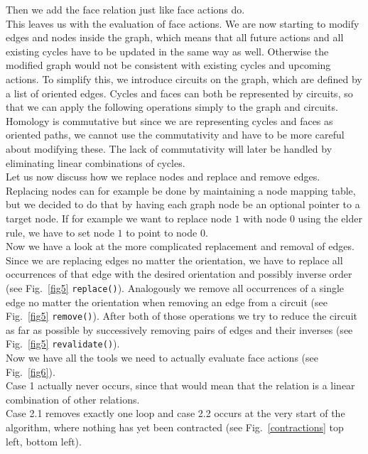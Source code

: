 \documentclass[11pt, a4paper, UKenglish]{article}
\begin{document}
    Then we add the face relation just like face actions do.\\
    This leaves us with the evaluation of face actions.
    We are now starting to modify edges and nodes inside the graph, which means that all future actions and all existing cycles have to be updated in the same way as well.
    Otherwise the modified graph would not be consistent with existing cycles and upcoming actions.
    To simplify this, we introduce circuits on the graph, which are defined by a list of oriented edges.
    Cycles and faces can both be represented by circuits, so that we can apply the following operations simply to the graph and circuits.
    Homology is commutative but since we are representing cycles and faces as oriented paths, we cannot use the commutativity and have to be more careful about modifying these.
    The lack of commutativity will later be handled by eliminating linear combinations of cycles.\\
    Let us now discuss how we replace nodes and replace and remove edges.
    Replacing nodes can for example be done by maintaining a node mapping table, but we decided to do that by having each graph node be an optional pointer to a target node.
    If for example we want to replace node $1$ with node $0$ using the elder rule, we have to set node $1$ to point to node $0$.\\
    Now we have a look at the more complicated replacement and removal of edges.
    Since we are replacing edges no matter the orientation, we have to replace all occurrences of that edge with the desired orientation and possibly inverse order (see Fig.\ \ref{fig5} \texttt{replace()}).
    Analogously we remove all occurrences of a single edge no matter the orientation when removing an edge from a circuit (see Fig.\ \ref{fig5} \texttt{remove()}).
    After both of those operations we try to reduce the circuit as far as possible by successively removing pairs of edges and their inverses (see Fig.\ \ref{fig5} \texttt{revalidate()}).\\
    \newpage
    Now we have all the tools we need to actually evaluate face actions (see Fig.\ \ref{fig6}).\\
    
    Case 1 actually never occurs, since that would mean that the relation is a linear combination of other relations.\\
    Case 2.1 removes exactly one loop and case 2.2 occurs at the very start of the algorithm, where nothing has yet been contracted (see Fig.\ \ref{contractions} top left, bottom left).\\
\end{document}
